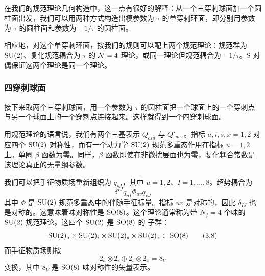 在我们的规范理论几何构造中，这一点有很好的解释：从一个三穿刺球面加一个圆柱面出发，我们可以用两种方式构造出模参数为 $\tau$ 的单穿刺环面，即分别用参数为 $\tau$ 的圆柱面和参数为 $-1/\tau$ 的圆柱面。

相应地，对这个单穿刺环面，按我们的规则可以配上两个规范理论：规范群为 $\mathrm{SU}(2)$、复化规范耦合为 $\tau$ 的 $\mathcal{N}=4$ 理论，或同一理论但规范耦合为 $-1/\tau$。S-对偶保证这两个理论是同一个理论。

\subsubsection{四穿刺球面}

接下来取两个三穿刺球面，用一个参数为 $\tau$ 的圆柱面把一个球面上的一个穿刺点与另一个球面上的一个穿刺点连接起来。这样就得到一个四穿刺球面。

用规范理论的语言说，我们有两个三基表示 $Q_{aiu}$ 与 $Q'_{usx}$。指标 $a,i,s,x=1,2$ 对应四个 $\mathrm{SU}(2)$ 对称性，而有一个动力学 $\mathrm{SU}(2)$ 规范多重态作用在指标 $u=1,2$ 上。单圈 $\beta$ 函数为零。同样，$\beta$ 函数即使在非微扰层面也为零，复化耦合常数是该理论真正的无量纲参数。

我们可以把手征物质场重新组织为 $q_{uI}$，其中 $u=1,2$、$I=1,\dots,8$。超势耦合为
\begin{equation}
  \delta^{IJ} q_{uI} \Phi_{uv} q_{vJ}
  \tag{3.7}
\end{equation}
其中 $\Phi$ 是 $\mathrm{SU}(2)$ 规范多重态中的伴随手征标量。指标 $uv$ 是对称的，因此 $\delta_{IJ}$ 也是对称的。这意味着味对称性是 $\mathrm{SO}(8)$。这个理论通常称为带 $N_f=4$ 个味的 $\mathrm{SU}(2)$ 规范理论。这四个 $\mathrm{SU}(2)$ 是 $\mathrm{SO}(8)$ 的%
子群：
\begin{equation}
  \mathrm{SU}(2)_a \times \mathrm{SU}(2)_i \times \mathrm{SU}(2)_s \times \mathrm{SU}(2)_x \subset \mathrm{SO}(8)
  \tag{3.8}
\end{equation}
而手征物质场则按
\begin{equation}
  2_a \otimes 2_i \oplus 2_s \otimes 2_x = 8_V
  \tag{3.9}
\end{equation}
变换，其中 $8_V$ 是 $\mathrm{SO}(8)$ 味对称性的矢量表示。



